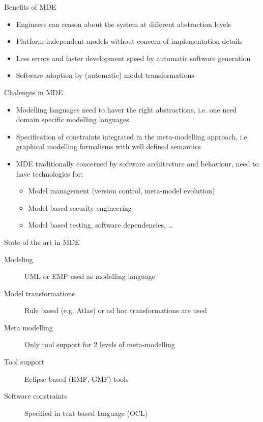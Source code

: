 \documentclass[slidetop,mathserif,red]{beamer}
\begin{document}
\begin{frame}{Benefits of MDE}

    \begin{itemize}
    \item Engineers can reason about the system at different abstraction levels
    \item Platform independent models without concern of implementation details
    \item Less errors and faster development speed by automatic software generation
    \item Software adoption by (automatic) model transformations
    \end{itemize}
\end{frame}


\begin{frame}{Chalenges in MDE}

    \begin{itemize}
    \item Modelling languages need to haver the right abstractions, i.e. one need domain specific modelling languages
    \item Specification of constraints integrated in the meta-modelling approach, i.e. graphical modelling formalisms with well defined semantics
    \item MDE traditionally concerned by software architecture and behaviour, need to have technologies for:
        \begin{itemize}
        \item Model management (version control, meta-model evolution)
        \item Model based security engineering
        \item Model based testing, software dependencies, \ldots
        \end{itemize}
    \end{itemize}
\end{frame}



\begin{frame}{State of the art in MDE}
  \begin{description}
  \item [Modeling] UML or EMF used as modelling language

  \item [Model transformations] Rule based (e.g. Atlas) or ad hoc transformations are used

  \item [Meta modelling] Only tool support for 2 levels of meta-modelling

  \item [Tool support] Eclipse based (EMF, GMF) tools

  \item [Software constraints] Specified in text based language (OCL)
  \end{description}
\end{frame}
\end{document}
